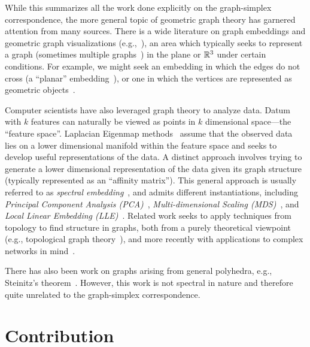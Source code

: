 While this summarizes all  the work done explicitly on the  graph-simplex correspondence, the  more general topic of geometric graph theory has  garnered attention from many sources.  
There is a wide literature on graph embeddings and geometric graph visualizations (e.g.,~\cite{tamassia2013handbook,brass2007simultaneous,kamada1989algorithm,fruchterman1991graph,de1990draw}), an area  which typically seeks to represent a  graph (sometimes multiple graphs~\cite{erten2005simultaneous,evans2016simultaneous,blasius2012simultaneous}) in the plane or $\mathbb{R}^3$ under  certain  conditions. For example, we might seek  an embedding in which the edges do not cross (a ``planar'' embedding~\cite{kant1993algorithms,nishizeki2004planar}), or one in which the vertices are represented as geometric objects~\cite{dean1997rectangle}. 


Computer scientists have  also leveraged graph theory to analyze data. Datum with $k$  features can naturally be viewed  as points in $k$ dimensional space---the ``feature space''.  
Laplacian Eigenmap methods~\cite{belkin2002laplacian} assume that the observed data lies on a lower dimensional  manifold within the  feature space and seeks to develop useful representations of the data.  
A distinct approach involves trying to generate a lower dimensional representation of the  data given its graph structure  (typically represented as an ``affinity matrix''). This general approach is usually referred to as \emph{spectral embedding}~\cite{brand2003unifying,bengio2004learning}, and admits different instantiations,  
including \emph{Principal Component Analysis (PCA)}~\cite{jolliffe2011principal}, 
\emph{Multi-dimensional Scaling (MDS)}~\cite{kruskal1978multidimensional,cox2000multidimensional}, and 
\emph{Local  Linear Embedding (LLE)}~\cite{roweis2000nonlinear}. 
Related work seeks  to apply techniques from topology to  find structure in graphs, both from a purely theoretical viewpoint  (e.g., topological  graph theory~\cite{gross2001topological}),  and more recently with applications to complex networks in mind~\cite{salnikov2018simplicial,wu2015emergent}. 

There has also been work on graphs arising from general polyhedra, e.g., Steinitz's theorem~\cite{steinitz1922polyeder}. However, this work is not spectral in nature and therefore quite unrelated to the graph-simplex  correspondence. 

\section{Contribution}
\label{chap:intro_contribution}

